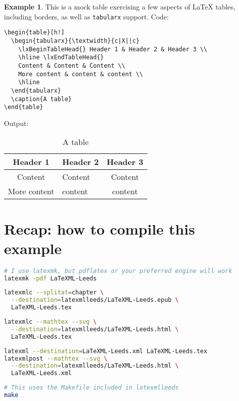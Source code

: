 \documentclass[a4paper]{article}
\theoremstyle{definition}
\newtheorem{exa}{Example}[subsection]
\begin{document}
\begin{exa}
  This is a mock table exercising a few aspects of \LaTeX{} tables, including borders, as well as \verb|tabularx| support.
  Code:
  \begin{lstlisting}[style=latexml]
\begin{table}[h!]
  \begin{tabularx}{\textwidth}{c|X||c}
    \lxBeginTableHead{} Header 1 & Header 2 & Header 3 \\
    \hline \lxEndTableHead{}
    Content & Content & Content \\
    More content & content & content \\
    \hline
  \end{tabularx}
  \caption{A table}
\end{table}
  \end{lstlisting}
  Output:
  \begin{table}[h!]
    \begin{tabularx}{\textwidth}{c|X||c}
      \lxBeginTableHead{} Header 1 & Header 2 & Header 3 \\
      \hline \lxEndTableHead{}
      Content & Content & Content \\
      More content & content & content \\
      \hline
    \end{tabularx}
    \caption{A table}
  \end{table}
\end{exa}
\section{Recap: how to compile this example}
\begin{lstlisting}[language=bash,caption={Generate the PDF}]
# I use latexmk, but pdflatex or your preferred engine will work
latexmk -pdf LaTeXML-Leeds
\end{lstlisting}
\begin{lstlisting}[language=bash,caption={Generate the EPUB}]
latexmlc --splitat=chapter \
  --destination=latexmlleeds/LaTeXML-Leeds.epub \
  LaTeXML-Leeds.tex
\end{lstlisting}
\begin{lstlisting}[language=bash,caption={Generate the HTML}]
latexmlc --mathtex --svg \
  --destination=latexmlleeds/LaTeXML-Leeds.html \
  LaTeXML-Leeds.tex
\end{lstlisting}
\begin{lstlisting}[language=bash,caption={Generate the HTML in two steps}]
latexml --destination=LaTeXML-Leeds.xml LaTeXML-Leeds.tex
latexmlpost --mathtex --svg \
  --destination=latexmlleeds/LaTeXML-Leeds.html \
  LaTeXML-Leeds.xml
\end{lstlisting}
\begin{lstlisting}[language=bash,caption={Do all the above steps in one go}]
# This uses the Makefile included in latexmlleeds
make
\end{lstlisting}
\end{document}
